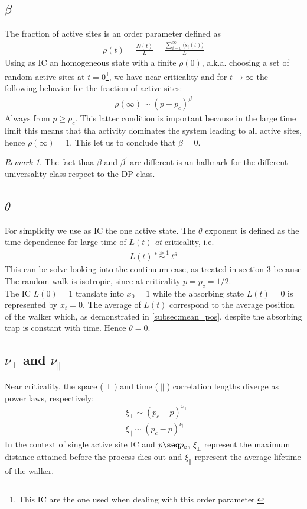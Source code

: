 \documentclass[4apaper,11pt,fleqn]{article}
\theoremstyle{remark}
\newtheorem*{rem}{Remark}
\theoremstyle{definition}
\begin{document}
\subsection{$\beta$}
The fraction of active sites is an order parameter defined as
\begin{align*}
  \rho (t) = \frac{N(t)}{L} = \frac{\sum_{i=0}^{\infty} \langle s_i(t) \rangle }{L}
\end{align*}
Using as IC an homogeneous state with a finite $\rho(0)$,  a.k.a. choosing a set of random active sites at $t=0$\;\footnote{This IC are the one used when dealing with this order parameter.}, we have near criticality and for $t\rightarrow \infty$ the following behavior for the fraction of active sites:
\begin{align*}
  \rho(\infty) \sim (p-p_c)^\beta
\end{align*}
Always from $p \geq p_c$. This latter condition is important because in the large time limit this means that tha activity dominates the system leading to all active sites, hence $\rho(\infty) = 1$.
This let us to conclude that $ \beta = 0$.

\begin{rem}
  The fact thaa $\beta$ and $\beta^\prime$ are different is an hallmark for the different universality class respect to the DP class.
\end{rem}


\subsection{$\theta$}
For simplicity we use as IC the one active state. The $\theta$ exponent is defined as the time dependence for large time of $L(t)$ \emph{at} criticality, i.e.
\begin{align*}
  L(t)\; \overset{t \gg 1}{\sim} \;t^\theta
\end{align*}
This can be solve looking into the continuum case, as treated in section 3 because The random walk is isotropic, since at criticality $p=p_c=1/2$.\\
The IC $L(0) = 1$ translate into $x_0=1$ while the absorbing state $L(t)=0$ is represented by $x_t=0$. The average of $L(t)$ correspond to the average position of the walker which, as demonstrated in \ref{subsec:mean_pos}, despite the absorbing trap is constant with time. Hence $\theta = 0$.


\subsection{$\nu_\perp$ and $\nu_\parallel$}
Near criticality, the space ($\perp$) and time ($\parallel$) correlation lengths diverge as power laws, respectively:
\begin{align*}
  &\xi_{\perp} \sim (p_c-p)^{\nu_\perp} \\
  &\xi_{\parallel} \sim (p_c-p)^{\nu_\parallel}
\end{align*}
In the context of single active site IC and $p \seq p_c$, $\xi_{\perp}$ represent the maximum distance attained before the process dies out and $\xi_{\parallel}$ represent the average lifetime of the walker.
\end{document}
